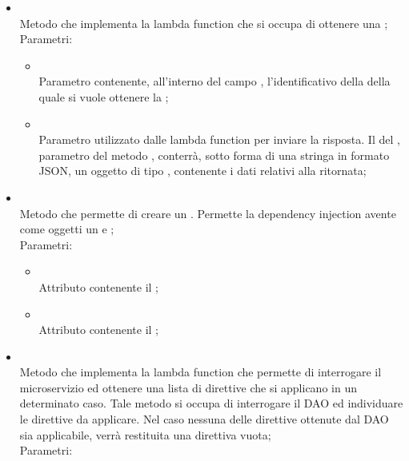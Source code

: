 \begin{itemize}
\begin{itemize}
\begin{itemize}
		\end{itemize}
		\item[]  \\
		Metodo che implementa la lambda function che si occupa di ottenere una ;\\
		Parametri:
		\begin{itemize}
			\item {} \\
			Parametro contenente, all'interno del campo , l'identificativo della  della quale si vuole ottenere la ;
			\item {} \\
			Parametro utilizzato dalle lambda function per inviare la risposta. Il  del , parametro del metodo , conterrà, sotto forma di una stringa in formato JSON, un oggetto di tipo , contenente i dati relativi alla  ritornata;
		\end{itemize}
		\item[]  \\
		Metodo che permette di creare un . Permette la dependency injection avente come oggetti un  e ;\\
		Parametri:
		\begin{itemize}
			\item {} \\
			Attributo contenente il ;
			\item {} \\
			Attributo contenente il ;
		\end{itemize}
		\item[]  \\
		Metodo che implementa la lambda function che permette di interrogare il microservizio ed ottenere una lista di direttive che si applicano in un determinato caso.
Tale metodo si occupa di interrogare il DAO ed individuare le direttive da applicare. Nel caso nessuna delle direttive ottenute dal DAO sia applicabile, verrà restituita una direttiva vuota;\\
		Parametri:
		\begin{itemize}

\end{itemize}
\end{itemize}
\end{itemize}
